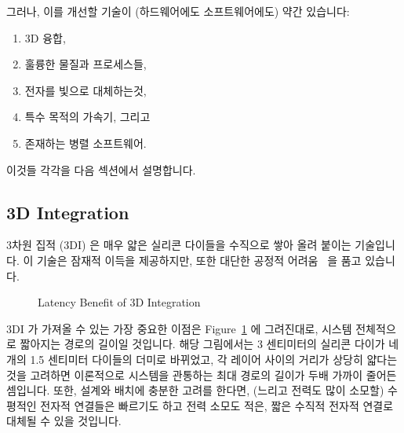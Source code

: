 그러나, 이를 개선할 기술이 (하드웨어에도 소프트웨어에도) 약간 있습니다:
\iffalse

There are nevertheless some technologies (both hardware and software)
that might help improve matters:
\fi

\begin{enumerate}
\item	3D 융합,
\item	훌륭한 물질과 프로세스들,
\item	전자를 빛으로 대체하는것,
\item	특수 목적의 가속기, 그리고
\item	존재하는 병렬 소프트웨어.
\iffalse

\item	3D integration,
\item	Novel materials and processes,
\item	Substituting light for electricity,
\item	Special-purpose accelerators, and
\item	Existing parallel software.
\fi
\end{enumerate}

이것들 각각을 다음 섹션에서 설명합니다.
\iffalse

Each of these is described in one of the following sections.
\fi

\subsection{3D Integration}
\label{sec:cpu:3D Integration}

3차원 집적 (3DI) 은 매우 얇은 실리콘 다이들을 수직으로 쌓아 올려 붙이는
기술입니다.
이 기술은 잠재적 이득을 제공하지만, 또한 대단한 공정적
어려움~\cite{JohnKnickerbocker2008:3DI} 을 품고 있습니다.
\iffalse

3-dimensional integration (3DI) is the practice of bonding
very thin silicon dies to each other in a vertical stack.
This practice provides potential benefits, but also poses
significant fabrication challenges~\cite{JohnKnickerbocker2008:3DI}.
\fi

\begin{figure}[tb]
\centering
{}
\caption{Latency Benefit of 3D Integration}
\label{fig:cpu:Latency Benefit of 3D Integration}
\end{figure}

3DI 가 가져올 수 있는 가장 중요한 이점은
Figure~\ref{fig:cpu:Latency Benefit of 3D Integration} 에 그려진대로, 시스템
전체적으로 짧아지는 경로의 길이일 것입니다.
해당 그림에서는 3 센티미터의 실리콘 다이가 네개의 1.5 센티미터 다이들의 더미로
바뀌었고, 각 레이어 사이의 거리가 상당히 얇다는 것을 고려하면 이론적으로
시스템을 관통하는 최대 경로의 길이가 두배 가까이 줄어든 셈입니다.
또한, 설계와 배치에 충분한 고려를 한다면, (느리고 전력도 많이 소모할) 수평적인
전자적 연결들은 빠르기도 하고 전력 소모도 적은, 짧은 수직적 전자적 연결로
대체될 수 있을 것입니다.
\iffalse

